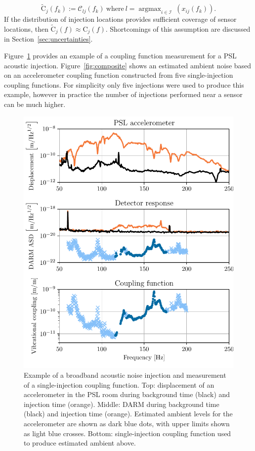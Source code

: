 \begin{equation}\label{eq:ccf}
	\widetilde{\mathrm{C}}_j(f_k) := \mathcal{C}_{lj}(f_k)\ \mathrm{where}\ l = \mathop{argmax}_{i\in\mathcal{I}}\ (x_{ij}(f_k)).
\end{equation}
If the distribution of injection locations provides sufficient coverage of sensor locations, then $\widetilde{\mathrm{C}}_j(f) \approx \mathrm{C}_j(f)$.
Shortcomings of this assumption are discussed in Section~\ref{sec:uncertainties}.

Figure~\ref{fig:injection} provides an example of a coupling function measurement for a \ac{PSL} acoustic injection.
Figure~\ref{fig:composite} shows an estimated ambient noise based on an accelerometer coupling function constructed from five single-injection coupling functions.
For simplicity only five injections were used to produce this example, however in practice the number of injections performed near a sensor can be much higher.

\begin{figure}
	\centering
	\includegraphics[width=\textwidth]{figures/injection-example.pdf}
	\caption{
		Example of a broadband acoustic noise injection and measurement of a single-injection coupling function.
		Top: displacement of an accelerometer in the PSL room during background time (black) and injection time (orange).
		Middle: DARM during background time (black) and injection time (orange).
		Estimated ambient levels for the accelerometer are shown as dark blue dots, with upper limits shown as light blue crosses.
		Bottom: single-injection coupling function used to produce estimated ambient above.}
	\label{fig:injection}
\end{figure}

